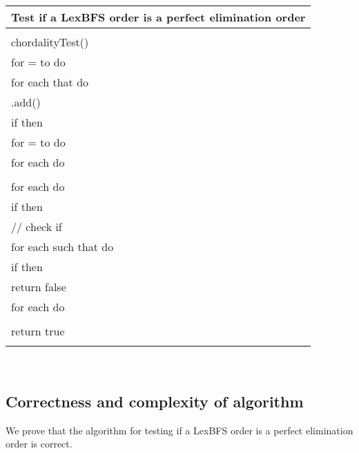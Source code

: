 \documentclass[a4paper, 11pt]{article}
\begin{document}
\begin{tabular}{l}
\hline
Test if a LexBFS order is a perfect elimination order\\
\hline
\\
chordalityTest()\\
\hspace{0.5cm}  for  =  to  do \\
\hspace{0.5cm}  for each  that  do\\
\hspace{1cm}        .add()\\
\hspace{1cm}        if  then \\ 
\hspace{0.5cm}  for  =  to  do\\
\hspace{1cm}        for each  do\\
\hspace{1.5cm}          \\
\hspace{1cm}        for each  do\\
\hspace{1.5cm}          if  then\\
\hspace{2cm}                // check if \\
\hspace{2cm}                for each  such that  do\\
\hspace{2.5cm}                  if  then\\
\hspace{3cm}                        return false\\
\hspace{1cm}        for each  do\\
\hspace{1.5cm}          \\
\hspace{0.5cm}  return true\\
\\
\hline
\end{tabular}\\


\subsection{Correctness and complexity of algorithm}

We prove that the algorithm for testing if a LexBFS order is a perfect elimination order 
is correct.
\end{document}
